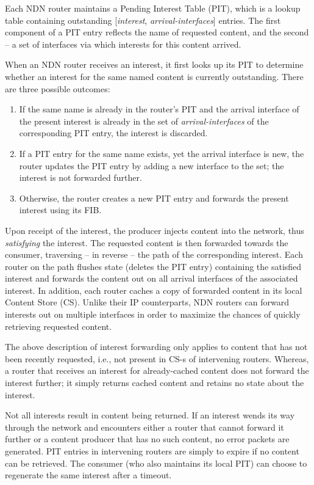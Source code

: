 \documentclass[conference]{IEEEtran}
\begin{document}
Each NDN router maintains a Pending Interest Table (PIT), which is a lookup table containing 
outstanding [{\em interest}, {\em arrival-interfaces}] entries. The first component of a PIT
entry reflects the name of requested content, and the second -- a set
of interfaces via which interests for this content arrived. 

When an NDN router receives an interest, it first looks up its PIT to determine
whether an interest for the same named content is currently outstanding. There
are three possible outcomes: 

\begin{enumerate}
\item If the same name is already in the router's 
PIT and the arrival interface of the present interest is already in the set of 
{\em arrival-interfaces}  of the corresponding PIT entry, the interest is discarded. 

\item  If a PIT entry for the same name exists, yet the arrival interface is new, the
router updates the PIT entry by adding a new interface to the set; the interest is not forwarded further.

\item Otherwise, the router creates a new PIT entry and forwards the present
interest using its FIB.
\end{enumerate}

Upon receipt of the interest, the producer injects content into the network, thus 
{\em satisfying} the interest. The requested content is then forwarded towards the 
consumer, traversing -- in reverse -- the path of the corresponding interest. Each router 
on the path flushes state (deletes the PIT entry) containing the satisfied interest and 
forwards the content out on all arrival interfaces of the associated interest.
In addition, each router caches a copy of forwarded content in its 
local Content Store (CS). Unlike their IP counterparts, NDN routers can 
forward interests out on multiple interfaces in order to maximize the chances 
of quickly retrieving requested content. 

The above description of interest forwarding only applies to content that has not been 
recently requested, i.e., not present in CS-s of intervening routers. Whereas, 
a router that receives an interest for already-cached content does not forward the interest 
further; it simply returns cached content and retains no state about the interest.

Not all interests result in content being returned. If an interest wends its way
through the network and encounters either a router that cannot forward it further
or a content producer that has no such content, no error packets are
generated. PIT entries in intervening routers are simply to expire if no content can be retrieved.
The consumer (who also maintains its local PIT) can choose to regenerate the same
interest after a timeout.
\end{document}
